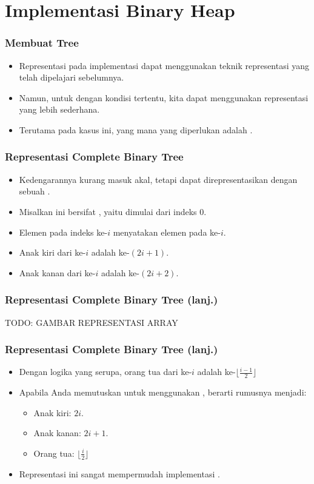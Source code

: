 \section{Implementasi Binary Heap}
\frame{\sectionpage}

\begin{frame}
\frametitle{Membuat Tree}
\begin{itemize}
  \item Representasi \ftree pada implementasi dapat menggunakan teknik representasi \fgraph yang telah dipelajari sebelumnya.
  \item Namun, untuk \ftree dengan kondisi tertentu, kita dapat menggunakan representasi yang lebih sederhana.
  \item Terutama pada kasus ini, yang mana \ftree yang diperlukan adalah .
\end{itemize}
\end{frame}

\begin{frame}
\frametitle{Representasi Complete Binary Tree}
\begin{itemize}
  \item Kedengarannya kurang masuk akal, tetapi  dapat direpresentasikan dengan sebuah \farray.
  \item Misalkan \farray ini bersifat , yaitu dimulai dari indeks 0.
  \item Elemen pada indeks ke-$i$ menyatakan elemen pada \fnode ke-$i$.
  \item Anak kiri dari \fnode ke-$i$ adalah \fnode ke-$(2i+1)$. 
  \item Anak kanan dari \fnode ke-$i$ adalah \fnode ke-$(2i+2)$. 
\end{itemize}
\end{frame}

\begin{frame}
\frametitle{Representasi Complete Binary Tree (lanj.)}
TODO: GAMBAR REPRESENTASI ARRAY
\end{frame}

\begin{frame}
\frametitle{Representasi Complete Binary Tree (lanj.)}
\begin{itemize}
  \item Dengan logika yang serupa, orang tua dari \fnode ke-$i$ adalah \fnode ke-$\lfloor\frac{i-1}{2}\rfloor$
  \item Apabila Anda memutuskan untuk menggunakan , berarti rumusnya menjadi:
  \begin{itemize}
    \item Anak kiri: $2i$.
    \item Anak kanan: $2i+1$.
    \item Orang tua: $\lfloor \frac{i}{2} \rfloor$
  \end{itemize}
  \item Representasi ini sangat mempermudah implementasi \pbinaryHeap.
\end{itemize}
\end{frame}

